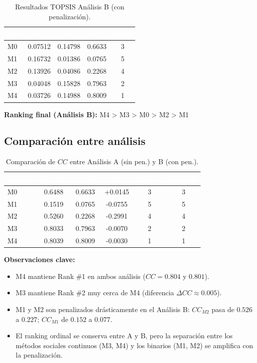 \documentclass[12pt,a4paper,oneside]{book}
\begin{document}
\begin{table}[H]
\centering
\caption{Resultados TOPSIS Análisis B (con penalización).}
\renewcommand{\arraystretch}{1.3}
\begin{tabular}{lcccc}
\toprule
\rowcolor{primary}
\textcolor{white}{\textbf{Alt.}} &
\textcolor{white}{\textbf{$D^+$}} &
\textcolor{white}{\textbf{$D^-$}} &
\textcolor{white}{\textbf{$CC$}} &
\textcolor{white}{\textbf{Rank}} \\
\midrule
M0 & 0.07512 & 0.14798 & 0.6633 & 3 \\
M1 & 0.16732 & 0.01386 & 0.0765 & 5 \\
M2 & 0.13926 & 0.04086 & 0.2268 & 4 \\
M3 & 0.04048 & 0.15828 & 0.7963 & 2 \\
M4 & 0.03726 & 0.14988 & 0.8009 & 1 \\
\bottomrule
\end{tabular}
\end{table}

\textbf{Ranking final (Análisis B):} M4 > M3 > M0 > M2 > M1

\subsection{Comparación entre análisis}

\begin{table}[H]
\centering
\caption{Comparación de $CC$ entre Análisis A (sin pen.) y B (con pen.).}
\renewcommand{\arraystretch}{1.3}
\begin{tabular}{lccccc}
\toprule
\rowcolor{primary}
\textcolor{white}{\textbf{Método}} &
\textcolor{white}{\textbf{$CC$ (A)}} &
\textcolor{white}{\textbf{$CC$ (B)}} &
\textcolor{white}{\textbf{$\Delta CC$}} &
\textcolor{white}{\textbf{Rank A}} &
\textcolor{white}{\textbf{Rank B}} \\
\midrule
M0 & 0.6488 & 0.6633 & +0.0145 & 3 & 3 \\
M1 & 0.1519 & 0.0765 & -0.0755 & 5 & 5 \\
M2 & 0.5260 & 0.2268 & -0.2991 & 4 & 4 \\
M3 & 0.8033 & 0.7963 & -0.0070 & 2 & 2 \\
M4 & 0.8039 & 0.8009 & -0.0030 & 1 & 1 \\
\bottomrule
\end{tabular}
\end{table}

\textbf{Observaciones clave:}
\begin{itemize}
    \item M4 mantiene Rank \#1 en ambos análisis ($CC = 0.804$ y $0.801$).
    \item M3 mantiene Rank \#2 muy cerca de M4 (diferencia $\Delta CC \approx 0.005$).
    \item M1 y M2 son penalizados drásticamente en el Análisis B: $CC_{M2}$ pasa de $0.526$ a $0.227$; $CC_{M1}$ de $0.152$ a $0.077$.
    \item El ranking ordinal se conserva entre A y B, pero la separación entre los métodos sociales continuos (M3, M4) y los binarios (M1, M2) se amplifica con la penalización.
\end{itemize}
\end{document}
